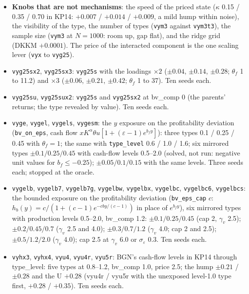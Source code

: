 \documentclass[11pt]{article}
\begin{document}
\begin{itemize}
\item \textbf{Knobs that are not mechanisms}: the speed of the priced state ($\kappa$ 0.15 / 0.35 / 0.70 in KP14: $+0.007$ / $+0.014$ / $+0.009$, a mild hump within noise), the visibility of the type, the number of types (\texttt{vym3} against \texttt{vym3t3}), the sample size (\texttt{vym3} at $N=1000$: room up, gap flat), and the ridge grid (DKKM $+0.0001$). The price of the interacted component is the one scaling lever (\texttt{vyx} to \texttt{vyg25}).
\item \texttt{vyg25sx2}, \texttt{vyg25sx3}: \texttt{vyg25s} with the loadings $\times2$ ($\pm0.04$, $\pm0.14$, $\pm0.28$; $\theta_f$ 1 to 11.2) and $\times3$ ($\pm0.06$, $\pm0.21$, $\pm0.42$; $\theta_f$ 1 to 37). Ten seeds each.
\item \texttt{vyg25su}, \texttt{vyg25sux2}: \texttt{vyg25s} and \texttt{vyg25sx2} at bv\_comp 0 (the parents' returns; the type revealed by value). Ten seeds each.
\item \texttt{vyge}, \texttt{vygel}, \texttt{vygels}, \texttt{vygesm}: the $y$ exposure on the profitability deviation (\texttt{bv\_on\_eps}, cash flow $x K^\alpha \theta u [1 + (\varepsilon-1) e^{b_f y}]$): three types 0.1 / 0.25 / 0.45 with $\theta_f=1$; the same with \texttt{type\_level} 0.6 / 1.0 / 1.6; six mirrored types $\pm0.1/0.25/0.45$ with cash-flow levels 0.5--2.0 (solved, not run: negative unit values for $b_f\le-0.25$); $\pm0.05/0.1/0.15$ with the same levels. Three seeds each; stopped at the oracle.
\item \texttt{vygelb}, \texttt{vygelb7}, \texttt{vygelb7g}, \texttt{vygelbw}, \texttt{vygelbx}, \texttt{vygelbc}, \texttt{vygelbc6}, \texttt{vygelbcs}: the bounded exposure on the profitability deviation (\texttt{bv\_eps\_cap} $c$: $h_b(y) = c/(1+(c-1)e^{-cby/(c-1)})$ in place of $e^{b_f y}$), six mirrored types with production levels 0.5--2.0, bv\_comp 1.2: $\pm0.1/0.25/0.45$ (cap 2, $\gamma_v$ 2.5); $\pm0.2/0.45/0.7$ ($\gamma_v$ 2.5 and 4.0); $\pm0.3/0.7/1.2$ ($\gamma_v$ 4.0; cap 2 and 2.5); $\pm0.5/1.2/2.0$ ($\gamma_v$ 4.0); cap 2.5 at $\gamma_v$ 6.0 or $\sigma_\varepsilon$ 0.3. Ten seeds each.
\item \texttt{vyhx3}, \texttt{vyhx4}, \texttt{vyu4}, \texttt{vyu4r}, \texttt{vyu5r}: BGN's cash-flow levels in KP14 through type\_level: five types at 0.8--1.2, bv\_comp 1.0, price 2.5; the hump $\pm0.21$ / $\pm0.28$ and the U $+0.28$ (vyu4r / vyu5r with the unexposed level-1.0 type first, $+0.28$ / $+0.35$). Ten seeds each.

\end{itemize}
\end{document}
